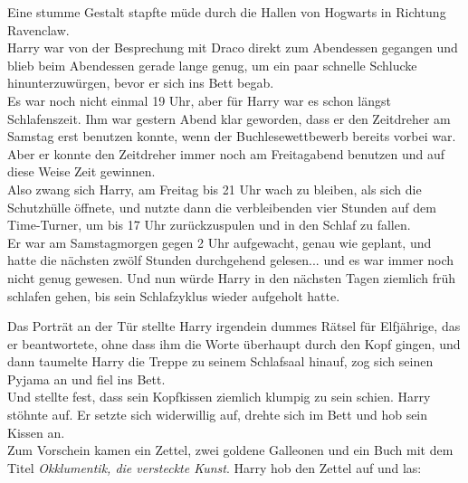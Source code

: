 {Eine stumme Gestalt stapfte müde durch die Hallen von Hogwarts in Richtung Ravenclaw.\\ Harry war von der Besprechung mit Draco direkt zum Abendessen gegangen und blieb beim Abendessen gerade lange genug, um ein paar schnelle Schlucke hinunterzuwürgen, bevor er sich ins Bett begab.\\ Es war noch nicht einmal 19 Uhr, aber für Harry war es schon längst Schlafenszeit. Ihm war gestern Abend klar geworden, dass er den Zeitdreher am Samstag erst benutzen konnte, wenn der Buchlesewettbewerb bereits vorbei war.\\ Aber er konnte den Zeitdreher immer noch am Freitagabend benutzen und auf diese Weise Zeit gewinnen.\\ Also zwang sich Harry, am Freitag bis 21 Uhr wach zu bleiben, als sich die Schutzhülle öffnete, und nutzte dann die verbleibenden vier Stunden auf dem Time-Turner, um bis 17 Uhr zurückzuspulen und in den Schlaf zu fallen.\\ Er war am Samstagmorgen gegen 2 Uhr aufgewacht, genau wie geplant, und hatte die nächsten zwölf Stunden durchgehend gelesen... und es war immer noch nicht genug gewesen. Und nun würde Harry in den nächsten Tagen ziemlich früh schlafen gehen, bis sein Schlafzyklus wieder aufgeholt hatte.

Das Porträt an der Tür stellte Harry irgendein dummes Rätsel für Elfjährige, das er beantwortete, ohne dass ihm die Worte überhaupt durch den Kopf gingen, und dann taumelte Harry die Treppe zu seinem Schlafsaal hinauf, zog sich seinen Pyjama an und fiel ins Bett.\\ Und stellte fest, dass sein Kopfkissen ziemlich klumpig zu sein schien. Harry stöhnte auf. Er setzte sich widerwillig auf, drehte sich im Bett und hob sein Kissen an.\\ Zum Vorschein kamen ein Zettel, zwei goldene Galleonen und ein Buch mit dem Titel \emph{Okklumentik, die versteckte Kunst}. Harry hob den Zettel auf und las:

}
